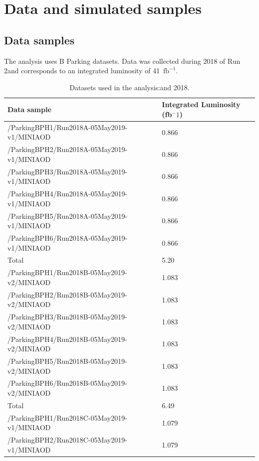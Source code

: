 \section{Data and simulated samples}\label{sec:samples}

\subsection{Data samples}

The analysis uses B Parking datasets. Data was
collected during 2018 of Run 2and corresponds to an integrated luminosity of
 41~$\mathrm{fb}^{-1}$.

\begin{table}[htb!]
  \caption{Datasets used in the analysis:and 2018.}
  \begin{center}
    \begin{tabular}{l|l}\hline
      Data sample & Integrated Luminosity (fb$^-1$)\\
      \hline
      /ParkingBPH1/Run2018A-05May2019-v1/MINIAOD  & 0.866 \\
      /ParkingBPH2/Run2018A-05May2019-v1/MINIAOD  & 0.866 \\
      /ParkingBPH3/Run2018A-05May2019-v1/MINIAOD  & 0.866 \\
      /ParkingBPH4/Run2018A-05May2019-v1/MINIAOD  & 0.866 \\
      /ParkingBPH5/Run2018A-05May2019-v1/MINIAOD  & 0.866 \\
      /ParkingBPH6/Run2018A-05May2019-v1/MINIAOD  & 0.866 \\
      Total & 5.20\\
      \hline
      /ParkingBPH1/Run2018B-05May2019-v2/MINIAOD  & 1.083 \\
      /ParkingBPH2/Run2018B-05May2019-v2/MINIAOD  & 1.083 \\
      /ParkingBPH3/Run2018B-05May2019-v2/MINIAOD  & 1.083 \\
      /ParkingBPH4/Run2018B-05May2019-v2/MINIAOD  & 1.083 \\
      /ParkingBPH5/Run2018B-05May2019-v2/MINIAOD  & 1.083 \\
      /ParkingBPH6/Run2018B-05May2019-v2/MINIAOD  & 1.083 \\
      Total & 6.49\\
      \hline
      /ParkingBPH1/Run2018C-05May2019-v1/MINIAOD  & 1.079 \\
      /ParkingBPH2/Run2018C-05May2019-v1/MINIAOD  & 1.079 \\

\end{tabular}
\end{center}
\end{table}
